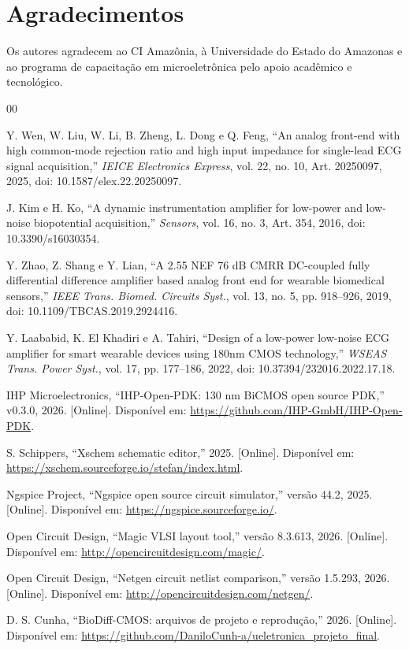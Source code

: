 \documentclass[conference]{IEEEtran}
\begin{document}
\section*{Agradecimentos}

Os autores agradecem ao CI Amazônia, à Universidade do Estado do Amazonas e ao programa de capacitação em microeletrônica pelo apoio acadêmico e tecnológico.

\begin{thebibliography}{00}

Y. Wen, W. Liu, W. Li, B. Zheng, L. Dong e Q. Feng, ``An analog front-end with high common-mode rejection ratio and high input impedance for single-lead ECG signal acquisition,'' \emph{IEICE Electronics Express}, vol. 22, no. 10, Art. 20250097, 2025, doi: 10.1587/elex.22.20250097.

J. Kim e H. Ko, ``A dynamic instrumentation amplifier for low-power and low-noise biopotential acquisition,'' \emph{Sensors}, vol. 16, no. 3, Art. 354, 2016, doi: 10.3390/s16030354.

Y. Zhao, Z. Shang e Y. Lian, ``A 2.55 NEF 76 dB CMRR DC-coupled fully differential difference amplifier based analog front end for wearable biomedical sensors,'' \emph{IEEE Trans. Biomed. Circuits Syst.}, vol. 13, no. 5, pp. 918--926, 2019, doi: 10.1109/TBCAS.2019.2924416.

Y. Laababid, K. El Khadiri e A. Tahiri, ``Design of a low-power low-noise ECG amplifier for smart wearable devices using 180nm CMOS technology,'' \emph{WSEAS Trans. Power Syst.}, vol. 17, pp. 177--186, 2022, doi: 10.37394/232016.2022.17.18.

IHP Microelectronics, ``IHP-Open-PDK: 130 nm BiCMOS open source PDK,'' v0.3.0, 2026. [Online]. Disponível em: \url{https://github.com/IHP-GmbH/IHP-Open-PDK}.

S. Schippers, ``Xschem schematic editor,'' 2025. [Online]. Disponível em: \url{https://xschem.sourceforge.io/stefan/index.html}.

Ngspice Project, ``Ngspice open source circuit simulator,'' versão 44.2, 2025. [Online]. Disponível em: \url{https://ngspice.sourceforge.io/}.

Open Circuit Design, ``Magic VLSI layout tool,'' versão 8.3.613, 2026. [Online]. Disponível em: \url{http://opencircuitdesign.com/magic/}.

Open Circuit Design, ``Netgen circuit netlist comparison,'' versão 1.5.293, 2026. [Online]. Disponível em: \url{http://opencircuitdesign.com/netgen/}.

D. S. Cunha, ``BioDiff-CMOS: arquivos de projeto e reprodução,'' 2026. [Online]. Disponível em: \url{https://github.com/DaniloCunh-a/ueletronica_projeto_final}.

\end{thebibliography}
\end{document}
